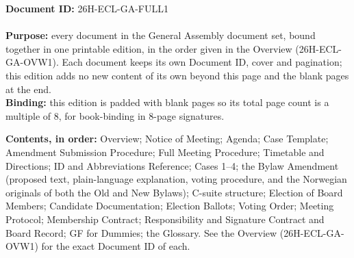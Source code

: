 \documentclass{../../../Common/Latex/Templates/rapport}
\date{\meetingdate, \meetingtime}
\begin{document}
\makecoverpage
\reportmainmatter

\noindent\textbf{Document ID:} 26H-ECL-GA-FULL1\\
\meetingline\\
\textbf{Purpose:} every document in the General Assembly document set, bound together in one printable edition, in the order given in the Overview (26H-ECL-GA-OVW1). Each document keeps its own Document ID, cover and pagination; this edition adds no new content of its own beyond this page and the blank pages at the end.\\
\textbf{Binding:} this edition is padded with blank pages so its total page count is a multiple of 8, for book-binding in 8-page signatures.

\vfill
\textbf{Contents, in order:} Overview; Notice of Meeting; Agenda; Case Template; Amendment Submission Procedure; Full Meeting Procedure; Timetable and Directions; ID and Abbreviations Reference; Cases 1--4; the Bylaw Amendment (proposed text, plain-language explanation, voting procedure, and the Norwegian originals of both the Old and New Bylaws); C-suite structure; Election of Board Members; Candidate Documentation; Election Ballots; Voting Order; Meeting Protocol; Membership Contract; Responsibility and Signature Contract and Board Record; GF for Dummies; the Glossary. See the Overview (26H-ECL-GA-OVW1) for the exact Document ID of each.

\clearpage
\end{document}
